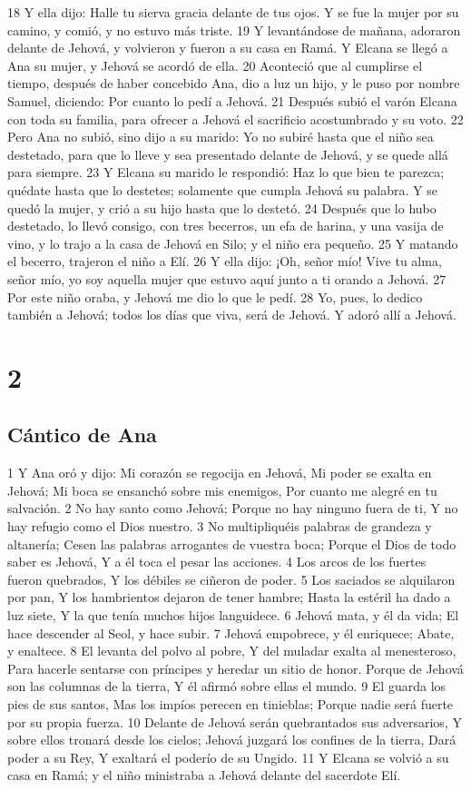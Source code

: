 18 Y ella dijo: Halle tu sierva gracia delante de tus ojos. Y se fue la mujer por su camino, y comió, y no estuvo más triste.
19 Y levantándose de mañana, adoraron delante de Jehová, y volvieron y fueron a su casa en Ramá. Y Elcana se llegó a Ana su mujer, y Jehová se acordó de ella.
20 Aconteció que al cumplirse el tiempo, después de haber concebido Ana, dio a luz un hijo, y le puso por nombre Samuel, diciendo: Por cuanto lo pedí a Jehová.
21 Después subió el varón Elcana con toda su familia, para ofrecer a Jehová el sacrificio acostumbrado y su voto.
22 Pero Ana no subió, sino dijo a su marido: Yo no subiré hasta que el niño sea destetado, para que lo lleve y sea presentado delante de Jehová, y se quede allá para siempre.
23 Y Elcana su marido le respondió: Haz lo que bien te parezca; quédate hasta que lo destetes; solamente que cumpla Jehová su palabra. Y se quedó la mujer, y crió a su hijo hasta que lo destetó.
24 Después que lo hubo destetado, lo llevó consigo, con tres becerros, un efa   de harina, y una vasija de vino, y lo trajo a la casa de Jehová en Silo; y el niño era pequeño.
25 Y matando el becerro, trajeron el niño a Elí.
26 Y ella dijo: ¡Oh, señor mío! Vive tu alma, señor mío, yo soy aquella mujer que estuvo aquí junto a ti orando a Jehová.
27 Por este niño oraba, y Jehová me dio lo que le pedí.
28 Yo, pues, lo dedico también a Jehová; todos los días que viva, será de Jehová. Y adoró allí a Jehová.

\chapter{2}

\section*{Cántico de Ana}

1 Y Ana oró y dijo:
Mi corazón se regocija en Jehová,
Mi poder se exalta en Jehová;
Mi boca se ensanchó sobre mis enemigos,
Por cuanto me alegré en tu salvación.
2 No hay santo como Jehová;
Porque no hay ninguno fuera de ti,
Y no hay refugio como el Dios nuestro.
3 No multipliquéis palabras de grandeza y altanería; 
Cesen las palabras arrogantes de vuestra boca;
Porque el Dios de todo saber es Jehová,
Y a él toca el pesar las acciones. 
4 Los arcos de los fuertes fueron quebrados,
Y los débiles se ciñeron de poder.
5 Los saciados se alquilaron por pan,
Y los hambrientos dejaron de tener hambre;
Hasta la estéril ha dado a luz siete,
Y la que tenía muchos hijos languidece.
6 Jehová mata, y él da vida;
El hace descender al Seol, y hace subir. 
7 Jehová empobrece, y él enriquece;
Abate, y enaltece.
8 El levanta del polvo al pobre,
Y del muladar exalta al menesteroso,
Para hacerle sentarse con príncipes y heredar un sitio de honor.
Porque de Jehová son las columnas de la tierra,
Y él afirmó sobre ellas el mundo.
9 El guarda los pies de sus santos,
Mas los impíos perecen en tinieblas;
Porque nadie será fuerte por su propia fuerza.
10 Delante de Jehová serán quebrantados sus adversarios,
Y sobre ellos tronará desde los cielos;
Jehová juzgará los confines de la tierra,
Dará poder a su Rey,
Y exaltará el poderío de su Ungido. 
11 Y Elcana se volvió a su casa en Ramá; y el niño ministraba a Jehová delante del sacerdote Elí.

